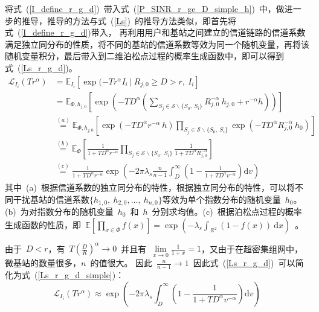 将式~(\ref{I_define_r_g_d})~带入式~(\ref{P_SINR_r_ge_D_simple_h})~中，做进一步的推导，推导的方法与式~(\ref{Ls})~的推导方法类似，即首先将式~(\ref{I_define_r_g_d})带入，
再利用用户和基站之间建立的信道链路的信道系数满足独立同分布的性质，将不同的基站的信道系数等效为同一个随机变量，再将该随机变量积分，最后带入到二维泊松点过程的概率生成函数中，即可以得到式~(\ref{Ls_r_g_d})。
\begin{equation}\label{Ls_r_g_d}
  \begin{aligned}
    \mathcal{L}_{I_i}(Tr^\alpha) &= \mathbb{E}_{I_i}\left[ \exp(-Tr^\alpha I_i~\big|~ R_{j,0} \geq D > r,~ I_i\right] \\
                               &= \mathbb{E}_{\Phi, h_{j,0}}\left[\exp\left(-TD^{\alpha}(\sum\limits_{S_j\in\mathcal{S} \backslash \{S_0,~S_i\}} {R_{j,0}^{-\alpha} ~ h_{j,0}}+ r^{-\alpha} h)\right)\right] \\
                               &\overset{(a)}{=} \mathbb{E}_{\Phi, h_{j,0}}\left[\exp(-TD^{\alpha} {r^{-\alpha} ~ h})\prod\limits_{S_j\in \mathcal{S} \backslash \{S_0,~S_i\}}\exp(-TD^{\alpha} {R_{j,0}^{-\alpha} ~ h_0})\right] \\
                               &\overset{(b)}{=} \mathbb{E}_{\Phi} \left[\frac{1}{1+ T D ^\alpha r^{-\alpha}}\prod\limits_{S_j\in \mathcal{S} \backslash \{S_0,~S_i\}}\frac{1}{1+ T D ^\alpha R_{j,0}^{-\alpha}}\right] \\
                               &\overset{(c)}{=} \frac{1}{1+ T D ^\alpha r^{-\alpha}}\exp\left(-2\pi\lambda_s\frac{n}{n-1}\int_{D}^{\infty} \left(1 - \frac{1}{1+ T D ^\alpha v^{-\alpha}}\right)\mathrm{d}v\right)
  \end{aligned}
\end{equation}
其中~(a)~根据信道系数的独立同分布的特性，根据独立同分布的特性，可以将不同干扰基站的信道系数$\{h_{1,0},~h_{2,0},\dots,~h_{n,0}\}$等效为单个指数分布的随机变量~$h_0$。
(b)~为对指数分布的随机变量~$h_0$~和~$h$~分别求均值。(c)~根据泊松点过程的概率生成函数的性质，即~$\mathbb{E}\left[\prod\nolimits_{x\in\Phi}f(x)\right]=\exp(-\lambda_s\int_{~\mathbb{R}^2}(1-f(x))~\mathrm{d}x)$~。

由于~$D<r$，有~$T(\frac{D}{R})^\alpha\rightarrow 0$~并且有~$\lim\limits_{x\rightarrow 0} \frac{1}{1+x}=1$，又由于在超密集组网中，微基站的数量很多，$n$~的值很大。
因此~$\frac{n}{n-1}\rightarrow 1$~因此式~(\ref{Ls_r_g_d})~可以简化为式~(\ref{Ls_r_g_d_simple})：
\begin{equation}\label{Ls_r_g_d_simple}
    \mathcal{L}_{I_i}(Tr^\alpha) \approx \exp\left(-2\pi\lambda_s\int_{D}^{\infty} \left(1 - \frac{1}{1+ T D ^\alpha v^{-\alpha}}\right)\mathrm{d}v\right)
\end{equation}

